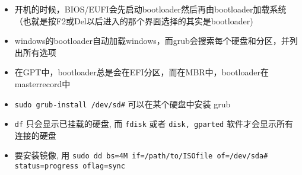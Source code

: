 
\begin{issues}
\issueDraft
\end{issues}

\begin{itemize}
\item 开机的时候，BIOS/EUFI会先启动bootloader然后再由bootloader加载系统（也就是按F2或Del以后进入的那个界面选择的其实是bootloader)
\item windows的bootloader自动加载windows，而grub会搜索每个硬盘和分区，并列出所有选项
\item 在GPT中，bootloader总是会在EFI分区，而在MBR中，bootloader在masterrecord中
\item \verb|sudo grub-install /dev/sd#| 可以在某个硬盘中安装 grub
\item \verb|df| 只会显示已挂载的硬盘, 而 \verb|fdisk| 或者 \verb|disk, gparted| 软件才会显示所有连接的硬盘
\item 要安装镜像, 用 \verb|sudo dd bs=4M if=/path/to/ISOfile of=/dev/sda# status=progress oflag=sync|
\end{itemize}


